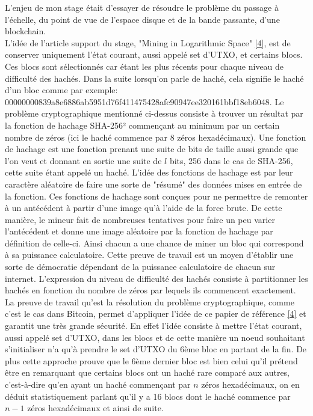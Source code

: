 \documentclass[12pt,a4paper]{article}
\newcommand{\source}[1]{\hyperlink{#1}{[#1]}}
\begin{document}
	L'enjeu de mon stage était d'essayer de résoudre le problème du passage à l'échelle, du point de vue de l'espace disque et de la bande passante, d'une blockchain.\\
	L'idée de l'article support du stage, "Mining in Logarithmic Space" \source{4}, est de conserver uniquement l'état courant, aussi appelé set d'UTXO, et certains blocs. Ces blocs sont sélectionnés car étant les plus récents pour chaque niveau de difficulté des hachés. Dans la suite lorsqu'on parle de haché, cela signifie le haché d'un bloc comme par exemple:\\ 00000000839a8e6886ab5951d76f411475428afc90947ee320161bbf18eb6048. Le problème cryptographique mentionné ci-dessus consiste à trouver un résultat par la fonction de hachage SHA-256² commençant au minimum par un certain nombre de zéros (ici le haché commence par 8 zéros hexadécimaux). Une fonction de hachage est une fonction prenant une suite de bits de taille aussi grande que l'on veut et donnant en sortie une suite de $l$ bits, 256 dans le cas de SHA-256, cette suite étant appelé un haché. L'idée des fonctions de hachage est par leur caractère aléatoire de faire une sorte de "résumé" des données mises en entrée de la fonction. Ces fonctions de hachage sont conçues pour ne permettre de remonter à un antécédent à partir d'une image qu'à l'aide de la force brute. De cette manière, le mineur fait de nombreuses tentatives pour faire un peu varier l'antécédent et donne une image aléatoire par la fonction de hachage par définition de celle-ci. Ainsi chacun a une chance de miner un bloc qui correspond à sa puissance calculatoire. Cette preuve de travail est un moyen d'établir une sorte de démocratie dépendant de la puissance calculatoire de chacun sur internet. L'expression du niveau de difficulté des hachés consiste à partitionner les hachés en fonction du nombre de zéros par lequels ils commencent exactement.\\ %
	La preuve de travail qu'est la résolution du problème cryptographique, comme c'est le cas dans Bitcoin, permet d'appliquer l'idée de ce papier de référence \source{4} et garantit une très grande sécurité. En effet l'idée consiste à mettre l'état courant, aussi appelé set d'UTXO, dans les blocs et de cette manière un noeud souhaitant s'initialiser n'a qu'à prendre le set d'UTXO du 6ème bloc en partant de la fin. De plus cette approche prouve que le 6ème dernier bloc est bien celui qu'il prétend être en remarquant que certains blocs ont un haché rare comparé aux autres, c'est-à-dire qu'en ayant un haché commençant par $n$ zéros hexadécimaux, on en déduit statistiquement parlant qu'il y a 16 blocs dont le haché commence par $n - 1$ zéros hexadécimaux et ainsi de suite.%
	
\end{document}
